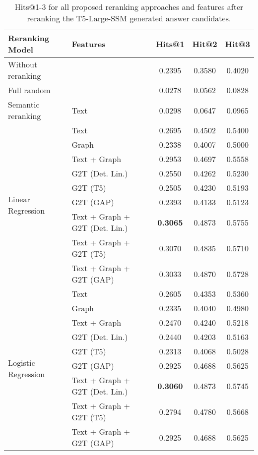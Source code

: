 \begin{table}[htbp]
    \caption{Hits@1-3 for all proposed reranking approaches and features after reranking the T5-Large-SSM generated answer candidates.}
    \label{tab:controllable_fusion:t5_large_ssm_all_results1}
    \centering
    \begin{tabular}{l p{6cm} c c c}
        \toprule
        \textbf{Reranking Model} & \textbf{Features} & \textbf{Hits@1} & \textbf{Hit@2} & \textbf{Hit@3} \\
        \midrule
        Without reranking & & 0.2395 & 0.3580 & 0.4020 \\
        \cmidrule(lr){1-5}
        Full random & & 0.0278 & 0.0562 & 0.0828 \\
        \cmidrule(lr){1-5}
        Semantic reranking & Text & 0.0298 & 0.0647 & 0.0965 \\
        \cmidrule(lr){1-5}
        \multirow{9}{*}{Linear Regression} & Text & 0.2695 & 0.4502 & 0.5400 \\
        & Graph & 0.2338 & 0.4007 & 0.5000 \\
        & Text + Graph & 0.2953 & 0.4697 & 0.5558 \\
        & G2T (Det. Lin.) & 0.2550 & 0.4262 & 0.5230 \\
        & G2T (T5) & 0.2505 & 0.4230 & 0.5193 \\
        & G2T (GAP) & 0.2393 & 0.4133 & 0.5123 \\
        & Text + Graph + G2T (Det. Lin.) & \textbf{0.3065} & 0.4873 & 0.5755 \\
        & Text + Graph + G2T (T5) & 0.3070 & 0.4835 & 0.5710 \\
        & Text + Graph + G2T (GAP) & 0.3033 & 0.4870 & 0.5728 \\
        \midrule
        \multirow{12}{*}{Logistic Regression} & Text & 0.2605 & 0.4353 & 0.5360 \\
        & Graph & 0.2335 & 0.4040 & 0.4980 \\
        & Text + Graph & 0.2470 & 0.4240 & 0.5218 \\
        & G2T (Det. Lin.) & 0.2440 & 0.4203 & 0.5163 \\
        & G2T (T5) & 0.2313 & 0.4068 & 0.5028 \\
        & G2T (GAP) & 0.2925 & 0.4688 & 0.5625 \\
        & Text + Graph + G2T (Det. Lin.) & \textbf{0.3060} & 0.4873 & 0.5745 \\
        & Text + Graph + G2T (T5) & 0.2794 & 0.4780 & 0.5668 \\
        & Text + Graph + G2T (GAP) & 0.2925 & 0.4688 & 0.5625 \\
        \bottomrule
    \end{tabular}
\end{table}

